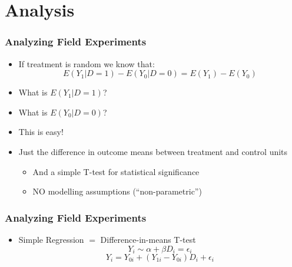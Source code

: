 \documentclass[xcolor=x11names,compress]{beamer}\usepackage[]{graphicx}\usepackage[]{color}
\renewcommand{\(}{\begin{columns}}
\renewcommand{\)}{\end{columns}}
\newcommand{\<}[1]{\begin{column}{#1}}
\renewcommand{\>}{\end{column}}
\begin{document}
\section{Analysis}

\begin{frame}
\frametitle{Analyzing Field Experiments}
\begin{itemize}
\item If treatment is random we know that:
$$E(Y_1|D=1) - E(Y_0|D=0) = E(Y_1) - E(Y_0) $$
\pause
\item What is $E(Y_1|D=1)$? 
\pause 
\item What is $E(Y_0|D=0)$?
\pause
\item This is easy! 
\pause
\item Just the difference in outcome means between treatment and control units
\pause
\begin{itemize}
\item And a simple T-test for statistical significance
\pause
\item NO modelling assumptions (``non-parametric'')
\end{itemize}
\end{itemize}
\end{frame}

\begin{frame}
\frametitle{Analyzing Field Experiments}
\begin{itemize}
\item Simple Regression $=$ Difference-in-means T-test
\pause
$$Y_i \sim \alpha + \beta D_i = \epsilon_i$$
\pause
$$Y_i = Y_{0i} + (Y_{1i} - Y_{0i}) D_i + \epsilon_i$$
\end{itemize}
\end{frame}
\end{document}
